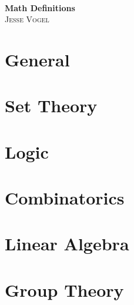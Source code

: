 \documentclass{report}
\begin{document}
\thispagestyle{empty}

\begin{center}
    \; \\ \vspace{4cm} \textbf{\Huge Math Definitions}
    \\ \vspace{2cm}
    \textsc{Jesse Vogel}
\end{center}

\newpage

{
    \tableofcontents
}

\newcommand{\cat}{}

\chapter{General}
\renewcommand{\cat}{GM}


\chapter{Set Theory}
\renewcommand{\cat}{ST}



\chapter{Logic}
\renewcommand{\cat}{LO}


\chapter{Combinatorics}
\renewcommand{\cat}{CO}



\chapter{Linear Algebra}
\renewcommand{\cat}{LA}







\chapter{Group Theory}
\renewcommand{\cat}{GT}

\end{document}

